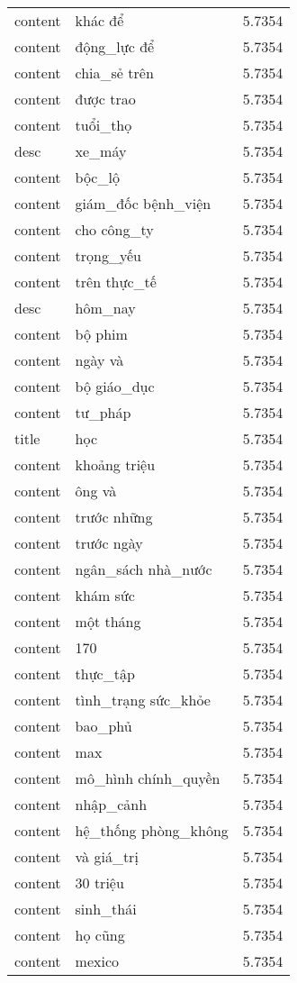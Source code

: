 \documentclass{article}
\begin{document}
\begin{tabular}{lll}
content & khác để & 5.7354\\
content & động\_lực để & 5.7354\\
content & chia\_sẻ trên & 5.7354\\
content & được trao & 5.7354\\
content & tuổi\_thọ & 5.7354\\
desc & xe\_máy & 5.7354\\
content & bộc\_lộ & 5.7354\\
content & giám\_đốc bệnh\_viện & 5.7354\\
content & cho công\_ty & 5.7354\\
content & trọng\_yếu & 5.7354\\
content & trên thực\_tế & 5.7354\\
desc & hôm\_nay & 5.7354\\
content & bộ phim & 5.7354\\
content & ngày và & 5.7354\\
content & bộ giáo\_dục & 5.7354\\
content & tư\_pháp & 5.7354\\
title & học & 5.7354\\
content & khoảng triệu & 5.7354\\
content & ông và & 5.7354\\
content & trước những & 5.7354\\
content & trước ngày & 5.7354\\
content & ngân\_sách nhà\_nước & 5.7354\\
content & khám sức & 5.7354\\
content & một tháng & 5.7354\\
content & 170 & 5.7354\\
content & thực\_tập & 5.7354\\
content & tình\_trạng sức\_khỏe & 5.7354\\
content & bao\_phủ & 5.7354\\
content & max & 5.7354\\
content & mô\_hình chính\_quyền & 5.7354\\
content & nhập\_cảnh & 5.7354\\
content & hệ\_thống phòng\_không & 5.7354\\
content & và giá\_trị & 5.7354\\
content & 30 triệu & 5.7354\\
content & sinh\_thái & 5.7354\\
content & họ cũng & 5.7354\\
content & mexico & 5.7354\\

\end{tabular}
\end{document}
